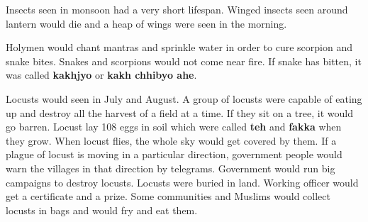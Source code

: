 Insects seen in monsoon had a very short lifespan. Winged insects seen around
lantern would die and a heap of wings were seen in the morning. 

Holymen would chant mantras and sprinkle water in order to cure scorpion and
snake bites. Snakes and scorpions would not come near fire. If snake has
bitten, it was called \textbf{kakhjyo} or \textbf{kakh chhibyo ahe}.

Locusts would seen in July and August. A group of locusts were capable of
eating up and destroy all the harvest of a field at a time. If they sit on a
tree, it would go barren. Locust lay 108 eggs in soil which were called
\textbf{teh} and \textbf{fakka} when they grow. When locust flies, the whole
sky would get covered by them. If a plague of locust is moving in a particular
direction, government people would warn the villages in that direction by
telegrams. Government would run big campaigns to destroy locusts. Locusts were
buried in land. Working officer would get a certificate and a prize. Some
communities and Muslims would collect locusts in bags and would fry and eat
them.

